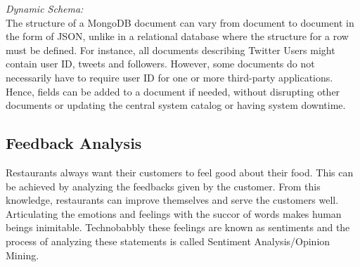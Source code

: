 \documentclass[conference]{IEEEtran}
\begin{document}
 

\textit{Dynamic Schema:}\\
The structure of a MongoDB document can vary from document to document in the form of JSON, unlike in a relational database where the structure for a row must be defined. For instance, all documents describing Twitter Users might contain user ID, tweets and followers. However, some documents do not necessarily have to require user ID for one or more third-party applications. Hence, fields can be added to a document if needed, without disrupting other documents or updating the central system catalog or having system downtime.
 


\subsection{\textbf{Feedback Analysis}}
Restaurants always want their customers to feel good about their food. This can be achieved by analyzing the feedbacks given by the customer. From this knowledge, restaurants can improve themselves and serve the customers well.\\
Articulating the emotions and feelings with the succor of words makes human beings inimitable. Technobabbly these feelings are known as sentiments and the process of analyzing these statements is called Sentiment Analysis/Opinion Mining\cite{b7}. 
\end{document}
